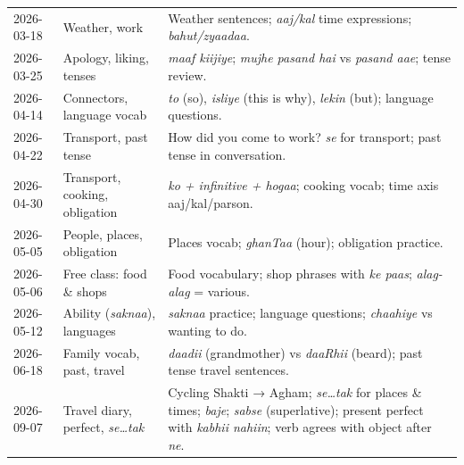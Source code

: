 \begin{longtable}{@{}p{2.4cm} p{3.8cm} p{8cm}@{}}
  2026-03-18 & Weather, work & Weather sentences; \textit{aaj/kal} time expressions; \textit{bahut/zyaadaa}. \\[4pt]
  2026-03-25 & Apology, liking, tenses & \textit{maaf kiijiye}; \textit{mujhe pasand hai} vs \textit{pasand aae}; tense review. \\[4pt]
  2026-04-14 & Connectors, language vocab & \textit{to} (so), \textit{isliye} (this is why), \textit{lekin} (but); language questions. \\[4pt]
  2026-04-22 & Transport, past tense & How did you come to work? \textit{se} for transport; past tense in conversation. \\[4pt]
  2026-04-30 & Transport, cooking, obligation & \textit{ko + infinitive + hogaa}; cooking vocab; time axis aaj/kal/parson. \\[4pt]
  2026-05-05 & People, places, obligation & Places vocab; \textit{ghanTaa} (hour); obligation practice. \\[4pt]
  2026-05-06 & Free class: food \& shops & Food vocabulary; shop phrases with \textit{ke paas}; \textit{alag-alag} = various. \\[4pt]
  2026-05-12 & Ability (\textit{saknaa}), languages & \textit{saknaa} practice; language questions; \textit{chaahiye} vs wanting to do. \\[4pt]
  2026-06-18 & Family vocab, past, travel & \textit{daadii} (grandmother) vs \textit{daaRhii} (beard); past tense travel sentences. \\[4pt]
  2026-09-07 & Travel diary, perfect, \textit{se\ldots tak} & Cycling Shakti → Agham; \textit{se\ldots tak} for places \& times; \textit{baje}; \textit{sabse} (superlative); present perfect with \textit{kabhii nahiin}; verb agrees with object after \textit{ne}. \\[4pt]
\end{longtable}
